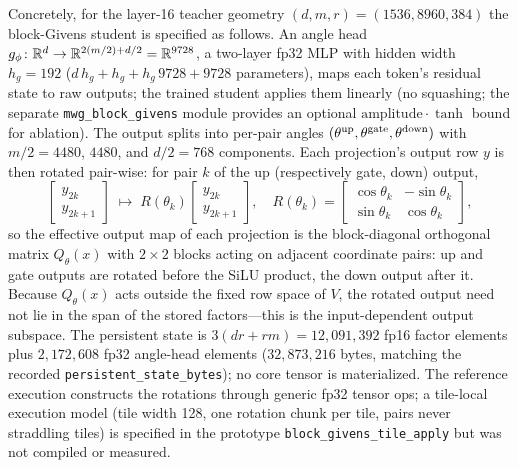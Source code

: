 Concretely, for the layer-16 teacher geometry $(d,m,r)=(1536,8960,384)$ the
block-Givens student is specified as follows. An angle head
$g_\phi\colon\mathbb{R}^{d}\to\mathbb{R}^{2(m/2)+d/2}=\mathbb{R}^{9728}$, a two-layer fp32 MLP with
hidden width $h_g=192$ ($d\,h_g+h_g+h_g\,9728+9728$ parameters), maps each
token's residual state to raw outputs; the trained student applies them
linearly (no squashing; the separate \texttt{mwg\_block\_givens} module
provides an optional $\text{amplitude}\cdot\tanh$ bound for ablation). The
output splits into per-pair angles
$(\theta^{\rm up},\theta^{\rm gate},\theta^{\rm down})$ with $m/2=4480$,
$4480$, and $d/2=768$ components. Each projection's output row $y$ is then
rotated pair-wise: for pair $k$ of the up (respectively gate, down) output,
\begin{equation}
 \begin{bmatrix}y_{2k}\\ y_{2k+1}\end{bmatrix}
 \;\longmapsto\;
 R(\theta_k)\begin{bmatrix}y_{2k}\\ y_{2k+1}\end{bmatrix},
 \quad R(\theta_k)=\begin{bmatrix}\cos\theta_k & -\sin\theta_k\\
 \sin\theta_k & \cos\theta_k\end{bmatrix},
 \label{eq:block-givens}
\end{equation}
so the effective output map of each projection is the block-diagonal
orthogonal matrix $Q_\theta(x)$ with $2\times2$ blocks acting on adjacent
coordinate pairs: up and gate outputs are rotated before the SiLU product,
the down output after it. Because $Q_\theta(x)$ acts outside the fixed
row space of $V$, the rotated output need not lie in the span of the stored
factors---this is the input-dependent output subspace. The persistent state
is $3(d r+r m)=12{,}091{,}392$ fp16 factor elements plus $2{,}172{,}608$
fp32 angle-head elements ($32{,}873{,}216$ bytes, matching the recorded
\texttt{persistent\_state\_bytes}); no core tensor is materialized. The
reference execution constructs the rotations through generic fp32 tensor
ops; a tile-local execution model (tile width 128, one rotation chunk per
tile, pairs never straddling tiles) is specified in the prototype
\texttt{block\_givens\_tile\_apply} but was not compiled or measured.

